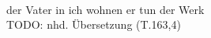 \begin{exe}
\ex \label{ex:T34029} \gll {}           \\
{der} {Vater} {in} {ich} {wohnen} {} {er} {tun} {der} {Werk} {}\\
\glt TODO: nhd. Übersetzung (T.163,4)
\end{exe}
